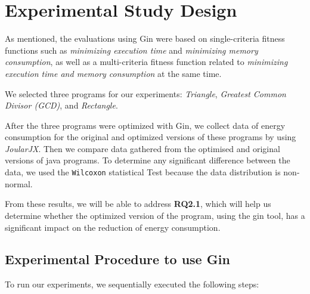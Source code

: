 \section{Experimental Study Design }
As mentioned, the evaluations using Gin were based on single-criteria fitness functions such as \textit{minimizing execution time} and \textit{minimizing memory consumption}, as well as a multi-criteria fitness function related to \textit{minimizing execution time and memory consumption} at the same time. 

\vspace{.5em}
We selected three programs for our experiments: \textit{Triangle}, \textit{Greatest Common Divisor (GCD)}, and \textit{Rectangle}. 

\vspace{.5em}
After the three programs were optimized with Gin, we collect data of energy consumption for the original and optimized versions of these programs by using \textit{JoularJX}.
Then we compare data gathered from the optimised and original versions of java programs. 
To determine any significant difference between the data, we used the \texttt{Wilcoxon} statistical Test because the data distribution is non-normal. 

\vspace{.5em}
From these results, we will be able to address \textbf{RQ2.1}, which will help us determine whether the optimized version of the program, using the gin tool, has a significant impact on the reduction of energy consumption.

\subsection{Experimental Procedure to use Gin}
To run our experiments, we sequentially executed the following steps:

